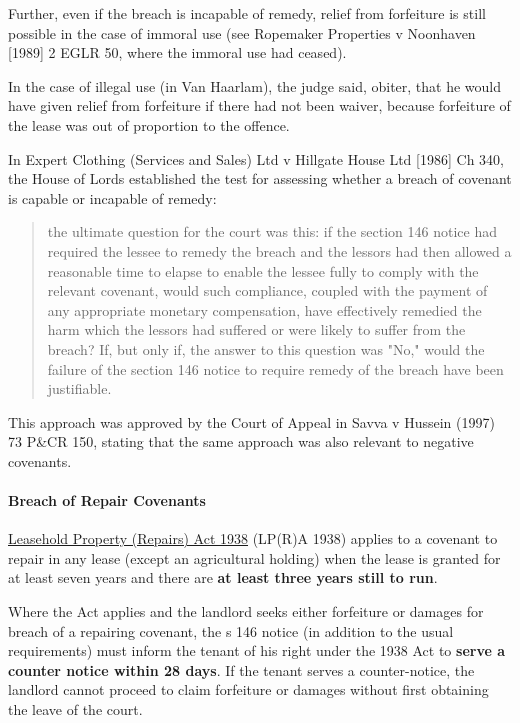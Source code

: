 \documentclass[
]{article}
\begin{document}
Further, even if the breach is incapable of remedy, relief from
forfeiture is still possible in the case of immoral use (see Ropemaker
Properties v Noonhaven {[}1989{]} 2 EGLR 50, where the immoral use had
ceased).

In the case of illegal use (in Van Haarlam), the judge said, obiter,
that he would have given relief from forfeiture if there had not been
waiver, because forfeiture of the lease was out of proportion to the
offence.

In Expert Clothing (Services and Sales) Ltd v Hillgate House Ltd
{[}1986{]} Ch 340, the House of Lords established the test for assessing
whether a breach of covenant is capable or incapable of remedy:

\begin{quote}
the ultimate question for the court was this: if the section 146 notice
had required the lessee to remedy the breach and the lessors had then
allowed a reasonable time to elapse to enable the lessee fully to comply
with the relevant covenant, would such compliance, coupled with the
payment of any appropriate monetary compensation, have effectively
remedied the harm which the lessors had suffered or were likely to
suffer from the breach? If, but only if, the answer to this question was
"No," would the failure of the section 146 notice to require remedy of
the breach have been justifiable.
\end{quote}

This approach was approved by the Court of Appeal in Savva v Hussein
(1997) 73 P\&CR 150, stating that the same approach was also relevant to
negative covenants.

\hypertarget{breach-of-repair-covenants}{%
\paragraph{Breach of Repair
Covenants}\label{breach-of-repair-covenants}}

\href{https://www.legislation.gov.uk/ukpga/Geo6/1-2/34/contents}{Leasehold
Property (Repairs) Act 1938} (LP(R)A 1938) applies to a covenant to
repair in any lease (except an agricultural holding) when the lease is
granted for at least seven years and there are \textbf{at least three
years still to run}.

Where the Act applies and the landlord seeks either forfeiture or
damages for breach of a repairing covenant, the s 146 notice (in
addition to the usual requirements) must inform the tenant of his right
under the 1938 Act to \textbf{serve a counter notice within 28 days}. If
the tenant serves a counter-notice, the landlord cannot proceed to claim
forfeiture or damages without first obtaining the leave of the court.
\end{document}
